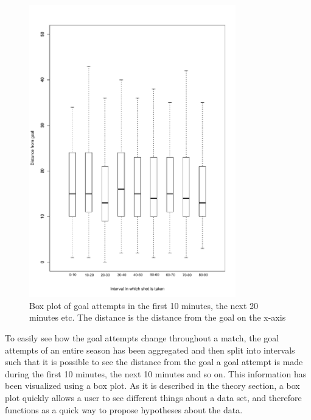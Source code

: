 \documentclass[Report.tex]{subfiles}
\begin{document}
\begin{figure}
\center
\includegraphics[width=0.8\textwidth]{"Figures/goal_attempts_box_plot_with_interval"}
\caption{Box plot of goal attempts in the first 10 minutes, the next 20 minutes etc. The distance is the distance from the goal on the x-axis}
\label{Fig:goal_attempts_box_plot}
\end{figure}

To easily see how the goal attempts change throughout a match, the goal attempts of an entire season has been aggregated and then
split into intervals such that it is possible to see the distance from the goal a goal attempt is made during the first 10 minutes, the next
10 minutes and so on. This information has been visualized using a box plot. As it is described in the theory section, a box plot quickly
allows a user to see different things about a data set, and therefore functions as a quick way to propose hypotheses about the data.
\end{document}
